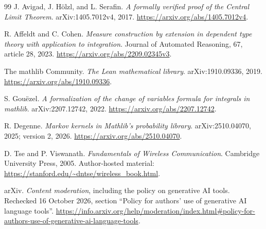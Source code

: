 \documentclass[11pt]{article}
\begin{document}
\begin{thebibliography}{99}
J. Avigad, J. H\"olzl, and L. Serafin.
\emph{A formally verified proof of the Central Limit Theorem}.
arXiv:1405.7012v4, 2017.
\url{https://arxiv.org/abs/1405.7012v4}.

R. Affeldt and C. Cohen.
\emph{Measure construction by extension in dependent type theory with
application to integration}.
Journal of Automated Reasoning, 67, article 28, 2023.
\url{https://arxiv.org/abs/2209.02345v3}.

The mathlib Community.
\emph{The Lean mathematical library}.
arXiv:1910.09336, 2019.
\url{https://arxiv.org/abs/1910.09336}.

S. Gou\"ezel.
\emph{A formalization of the change of variables formula for integrals in mathlib}.
arXiv:2207.12742, 2022.
\url{https://arxiv.org/abs/2207.12742}.

R. Degenne.
\emph{Markov kernels in Mathlib's probability library}.
arXiv:2510.04070, 2025; version 2, 2026.
\url{https://arxiv.org/abs/2510.04070}.

D. Tse and P. Viswanath.
\emph{Fundamentals of Wireless Communication}.
Cambridge University Press, 2005.
Author-hosted material: \url{https://stanford.edu/~dntse/wireless_book.html}.

arXiv. \emph{Content moderation}, including the policy on generative AI tools.
Rechecked 16 October 2026, section ``Policy for authors' use of generative AI
language tools''.
\url{https://info.arxiv.org/help/moderation/index.html#policy-for-authors-use-of-generative-ai-language-tools}.
\end{thebibliography}
\end{document}
